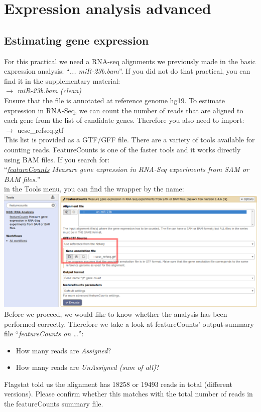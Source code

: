 \section{Expression analysis advanced}
\subsection{Estimating gene expression}
For this practical we need a RNA-seq alignments we previously made in the basic expression analysis: ``\textit{... miR-23b.bam}''.
If you did not do that practical, you can find it in the supplementary material: \\
\datalibrarydirrnaseqadvanced $\rightarrow$ \textit{miR-23b.bam (clean)}\\
Ensure that the file is annotated at reference genome hg19. To estimate expression in RNA-Seq, we can count the number of reads that are aligned to each gene from the list of candidate genes. Therefore you also need to import:\\
\datalibrarydirrnaseqadvanced $\rightarrow$ ucsc\_refseq.gtf\\
This list is provided as a GTF/GFF file.
There are a variety of tools available for counting reads.
FeatureCounts is one of the faster tools and it works directly using BAM files. If you search for:\\
``\textit{\underline{featureCounts} Measure gene expression in RNA-Seq experiments from SAM or BAM files.}''\\
in the Tools menu, you can find the wrapper by the name:\\
\includegraphics[width=\textwidth]{figures/expression_01.png}\\
Before we proceed, we would like to know whether the analysis has been performed correctly. Therefore we take a look at featureCounts’ output-summary file ``\textit{featureCounts on \ldots}'':
\begin{itemize}
	\item How many reads are \textit{Assigned}?
	\item How many reads are \textit{UnAssigned (sum of all)}?
\end{itemize}
Flagstat told us the alignment has 18258 or 19493 reads in total (different versions).
Please confirm whether this matches with the total number of reads in the featureCounts summary file.

